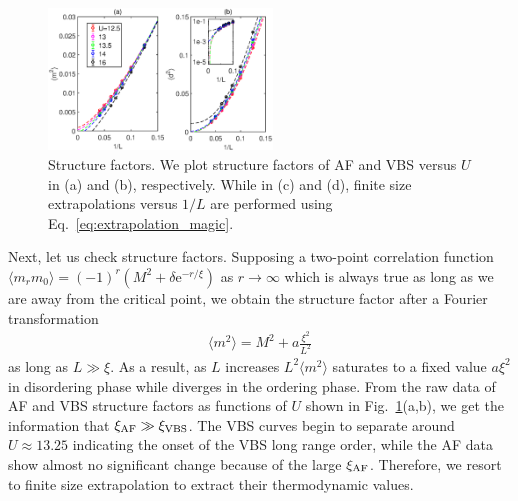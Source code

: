 \documentclass[twocolumn,superscriptaddress]{revtex4-1}
\begin{document}


\begin{figure}
  \includegraphics[width=0.53\textwidth]{extrapolation}
  \caption{\label{fig:structurefactor}Structure factors. We plot structure factors of AF and VBS versus $U$ in (a) and (b), respectively. While in (c) and (d), finite size extrapolations versus $1/L$ are performed using Eq.~\ref{eq:extrapolation_magic}.}
\end{figure}
Next, let us check structure factors. Supposing a two-point correlation function $\langle m_rm_0 \rangle=(-1)^r(M^2 + \delta\mathrm{e}^{-r/\xi})$ as $r\rightarrow\infty$ which is always true as long as we are away from the critical point, we obtain the structure factor after a Fourier transformation 
\begin{eqnarray}\label{eq:extrapolation}
  \langle m^2 \rangle=M^2+a\frac{\xi^2}{L^2}
\end{eqnarray}
as long as $L\gg\xi$. As a result, as $L$ increases $L^2\langle m^2 \rangle$ saturates to a fixed value $a\xi^2$ in disordering phase while diverges in the ordering phase. From the raw data of AF and VBS structure factors as functions of $U$ shown in Fig.~\ref{fig:structurefactor}(a,b), we get the information that $\xi_{\rm AF}\gg\xi_{\rm VBS}$. The VBS curves begin to separate around $U\approx13.25$ indicating the onset of the VBS long range order, while the AF data show almost no significant change because of the large $\xi_{\rm AF}$. Therefore, we resort to finite size extrapolation to extract their thermodynamic values. 
\end{document}
